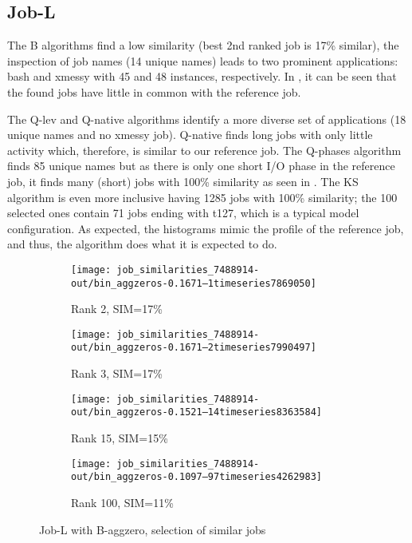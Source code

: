 \documentclass{jhps}
\begin{document}
\subsection{Job-L}

The B algorithms find a low similarity (best 2nd ranked job is 17\% similar), the inspection of job names (14 unique names) leads to two prominent applications: bash and xmessy with 45 and 48 instances, respectively.
In , it can be seen that the found jobs have little in common with the reference job.

The Q-lev and Q-native algorithms identify a more diverse set of applications (18 unique names and no xmessy job).
Q-native  finds long jobs with only little activity which, therefore, is similar to our reference job.
The Q-phases algorithm finds 85 unique names but as there is only one short I/O phase in the reference job, it finds many (short) jobs with 100\% similarity as seen in .
The KS algorithm is even more inclusive having 1285 jobs with 100\% similarity; the 100 selected ones contain 71 jobs ending with t127, which is a typical model configuration.
As expected, the histograms mimic the profile of the reference job, and thus, the algorithm does what it is expected to do.


\begin{figure}[bt]
\begin{subfigure}{0.47\textwidth}
\centering
\texttt{[image: job\_similarities\_7488914-out/bin\_aggzeros-0.1671--1timeseries7869050]}
\caption{Rank 2, SIM=17\%}
\end{subfigure}
\begin{subfigure}{0.47\textwidth}
\centering
\texttt{[image: job\_similarities\_7488914-out/bin\_aggzeros-0.1671--2timeseries7990497]}
\caption{Rank 3, SIM=17\%}
\end{subfigure}
\begin{subfigure}{0.47\textwidth}
\texttt{[image: job\_similarities\_7488914-out/bin\_aggzeros-0.1521--14timeseries8363584]}
\caption{Rank 15, SIM=15\%}
\end{subfigure}
\begin{subfigure}{0.47\textwidth}
\centering
\texttt{[image: job\_similarities\_7488914-out/bin\_aggzeros-0.1097--97timeseries4262983]}
\caption{Rank 100, SIM=11\%}
\end{subfigure}

\caption{Job-L with B-aggzero, selection of similar jobs}%
\label{fig:job-L-bin-aggzero}
\end{figure}
\end{document}
